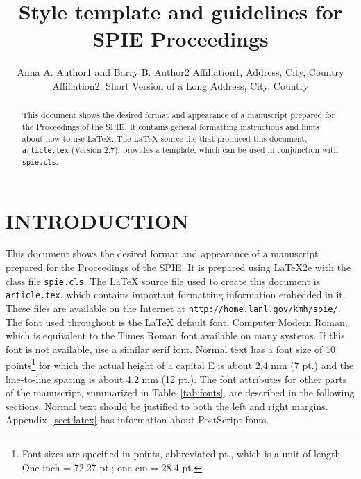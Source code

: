 \documentclass[]{spie}  %
\title{Style template and guidelines for SPIE Proceedings}
\author{Anna A. Author1\supit{a} and Barry B. Author2\supit{b}
\skiplinehalf
\supit{a}Affiliation1, Address, City, Country \\
\supit{b}Affiliation2, Short Version of a Long Address, City, Country
}
\begin{document}
 
  \maketitle 

\begin{abstract}
This document shows the desired format and appearance of a manuscript prepared for the Proceedings of the SPIE.  It contains general formatting instructions and hints about how to use LaTeX.  The LaTeX source file that produced this document, {\tt article.tex} (Version 2.7), provides a template, which can be used in conjunction with {\tt spie.cls}.  
\end{abstract}



\section{INTRODUCTION}
\label{sect:intro}  %

This document shows the desired format and appearance of a manuscript prepared for the Proceedings of the SPIE.  It is prepared using LaTeX2e\cite{Lamport94} with the class file {\tt spie.cls}.  The LaTeX source file used to create this document is {\tt article.tex}, which contains important formatting information embedded in it.  These files are available on the Internet at {\tt http://home.lanl.gov/kmh/spie/}.  The font used throughout is the LaTeX default font, Computer Modern Roman, which is equivalent to the Times Roman font available on many systems.  If this font is not available, use a similar serif font.  Normal text has a font size of 10 points\footnote{Font sizes are specified in points, abbreviated pt., which is a unit of length.  One inch = 72.27 pt.; one cm = 28.4 pt.} for which the actual height of a capital E is about 2.4 mm (7 pt.) and the line-to-line spacing is about 4.2 mm (12 pt.).  The font attributes for other parts of the manuscript, summarized in Table~\ref{tab:fonts}, are described in the following sections.  Normal text should be justified to both the left and right margins.  Appendix~\ref{sect:latex} has information about PostScript fonts.
\end{document}
